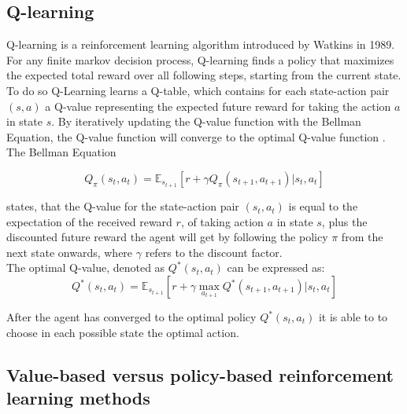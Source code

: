 \subsection{Q-learning}

Q-learning is a reinforcement learning algorithm  introduced by Watkins \cite{QLearning} in 1989. 
For any finite markov decision process, Q-learning finds a policy that maximizes the expected total reward over all following steps, starting from the current state.
To do so Q-Learning learns a Q-table, which contains for each state-action pair $(s, a)$ a Q-value representing the expected future reward for taking the action $a$ in state $s$. 
By iteratively updating the Q-value function with the Bellman Equation, the Q-value function will converge to the optimal Q-value function \cite{QLearningProof}.\\

The Bellman Equation 

\begin{equation} \label{eq:bellman_eq1}
Q_{\pi} (s_t, a_t) =\mathbb{E}_{s_{t+1}} [r + \gamma Q_\pi(s_{t+1}, a_{t+1}) | s_t, a_t]
\end{equation}

states, that the Q-value for the state-action pair $(s_t, a_t)$ is equal to the expectation of the received reward $r$, of taking action $a$ in state $s$, plus the discounted future reward the agent will get by following the policy $\pi$ from the next state onwards, where $\gamma$ refers to the discount factor.\\


The optimal Q-value, denoted as $Q^* (s_t, a_t)$ can be expressed as:
\begin{equation} \label{eq:1}
Q^* (s_t, a_t) = \mathbb{E}_{s_{t+1}} [r + \gamma \max_{a_{t+1}} Q^*(s_{t+1}, a_{t+1}) | s_t, a_t]
\end{equation}

After the agent has converged to the optimal policy $Q^* (s_t, a_t)$ it is able to to choose in each possible state the optimal action.\\


\subsection{Value-based versus policy-based reinforcement learning methods}


